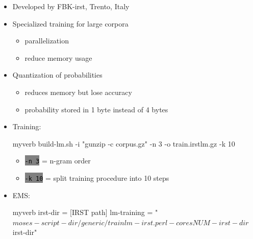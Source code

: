 \documentclass[landscape]{uedslides2C}
\newcommand{\littlecode}[1]{\colorbox{gray}{\textcolor{black}{\small \tt #1}}}
\begin{document}
\vspace{10mm}
\begin{itemize}

\item Developed by FBK-irst, Trento, Italy

\item Specialized training for large corpora
	\begin{itemize}
	\item parallelization
	\item reduce memory usage
	\end{itemize}

\item Quantization of probabilities
	\begin{itemize}
	\item reduces memory but lose accuracy
	\item probability stored in 1 byte instead of 4 bytes
	\end{itemize}
\end{itemize}


\begin{itemize}

\item Training: \\[3mm]
\begin{SaveVerbatim}{myverb} 
build-lm.sh -i "gunzip -c corpus.gz" -n 3 
      -o train.irstlm.gz -k 10
\end{SaveVerbatim}
\colorbox{gray}{}

\begin{itemize}
\item \littlecode{-n 3} = n-gram order
\item \littlecode{-k 10} = split training procedure into 10 steps
\end{itemize}

\item EMS:  \\[3mm]
  \begin{SaveVerbatim}{myverb} 
  irst-dir = [IRST path]
  lm-training = "$moses-script-dir/generic/trainlm-irst.perl 
		  -cores NUM -irst-dir $irst-dir"
  \end{SaveVerbatim}
  \colorbox{gray}{}

\end{itemize}
\end{document}
